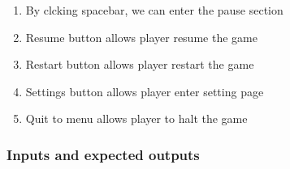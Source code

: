 \documentclass[11pt]{article}
\begin{document}
    \begin{enumerate}
        \item By clcking spacebar, we can enter the pause section
        \item Resume button allows player resume the game
        \item Restart button allows player restart the game
        \item Settings button allows player enter setting page
        \item Quit to menu allows player to halt the game
    \end{enumerate}

    \subsubsection*{Inputs and expected outputs}
\end{document}
